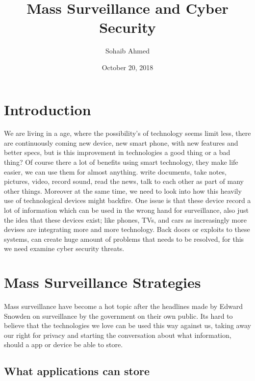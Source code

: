 \documentclass{article}
\title{Mass Surveillance and Cyber Security}
\author{Sohaib Ahmed}
\date{October 20, 2018}
\begin{document}
\maketitle
\newpage

\tableofcontents
\newpage

\section{Introduction}
\paragraph{}
We are living in a age, where the possibility's of technology seems limit less, there are continuously coming new device, new smart phone, with new features and better specs, but is this improvement in technologies a good thing or a bad thing? Of course there a lot of benefits using smart technology, they make life easier, we can use them for almost anything. write documents, take notes, pictures, video,  record sound, read the news, talk to each other as part of many other things. Moreover at the same time, we need to look into how this heavily use of technological devices might backfire. One issue is that these device record a lot of information which can be used in the wrong hand for surveillance, also just the idea that these devices exist; like phones, TVs, and cars as increasingly more devises are integrating more and more technology. Back doors or exploits to these systems, can create huge amount of problems that needs to be resolved, for this we need examine cyber security threats.

\section{Mass Surveillance Strategies}

\paragraph{}
Mass surveillance have become a hot topic after the headlines made by Edward Snowden on surveillance by the government on their own public. Its hard to believe that the technologies we love can be used this way against us, taking away our right for privacy and starting the conversation about what information, should a app or device be able to store. 

\subsection{What applications can store}
\end{document}
